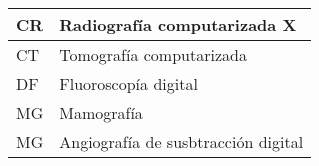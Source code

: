 


\begin{tabular}{p{}p{}}
\hline
CR &Radiografía computarizada X\\
\hline
CT&Tomografía computarizada\\
\hline
DF&Fluoroscopía digital\\
\hline
MG&Mamografía\\
\hline
MG&Angiografía de susbtracción digital \\
\hline
\end{tabular}


